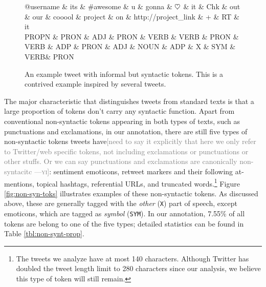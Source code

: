 \documentclass[11pt,a4paper]{article}
\newcommand{\heart}{\ensuremath\heartsuit}
\newcommand{\yjcomment}[1]{\textcolor{orange}{[$_\mathrm{L}^\mathrm{Y}$#1]}}
\newcommand{\yicomment}[1]{\textcolor{gray}{[#1 ---\textsc{yi}]}}
\begin{document}
\begin{figure}[t]
	\centering
	\small
	\begin{dependency}[edge slant=2, text only label, label style=above]
		\begin{deptext}
			@username \& its \& \#awesome \& u \& gonna \& $\heart$ \& it \& Chk \& out \& our \& cooool \& project \& on \& http://project\_link \& + \& RT \& it\\
			\tiny PROPN \& \tiny PRON \& \tiny ADJ \& \tiny PRON \& \tiny VERB \& \tiny VERB \& \tiny PRON \& \tiny VERB \& \tiny ADP \& \tiny PRON \& \tiny ADJ \& \tiny NOUN \& \tiny ADP \& \tiny X \& \tiny SYM \& \tiny VERB\& \tiny PRON\\
		\end{deptext}
	\end{dependency}
	\caption{An example tweet with informal but syntactic tokens.
		This is a contrived example inspired by several tweets.}\label{fig:informal-toks}
\end{figure}

The major characteristic that distinguishes tweets from standard texts is that
a large proportion of tokens don't carry any syntactic function. 
Apart from conventional non-syntactic tokens appearing in both types of texts, such as punctuations and exclamations,
in our annotation, there are still five types of non-syntactic tokens tweets have\yicomment{need to say it explicitly that here we only refer to Twitter/web specific tokens, not including exclamations or punctuations or other stuffs. Or we can say punctuations and exclamations are canonically non-syntacitc}: 
sentiment emoticons, retweet markers and their following at-mentions, topical hashtags, referential URLs, and
truncated words.\footnote{The tweets we analyze have at most 140
  characters. Although Twitter has doubled the tweet length limit to
  280 characters since our analysis, we believe this type of token
  will still remain.}  Figure \ref{fig:non-syn-toks} illustrates examples of
these non-syntactic tokens.  As discussed above, these are generally
tagged with the \emph{other} (\texttt{X}) part of speech, except
emoticons, which are tagged as \emph{symbol} (\texttt{SYM}).  In our annotation, 
7.55\% of all tokens are belong to one of the five types; detailed statistics can be found in Table \ref{tbl:non-synt-prop}.
\end{document}
